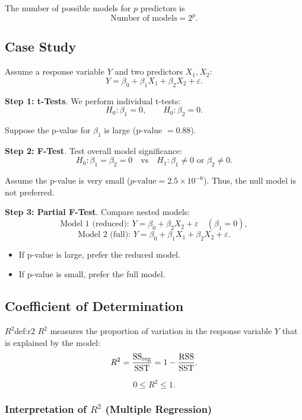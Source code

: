 The number of possible models for $p$ predictors is
\[
\text{Number of models} = 2^p.
\]

\subsection{Case Study}

Assume a response variable $Y$ and two predictors $X_1, X_2$:
\[
Y = \beta_0 + \beta_1 X_1 + \beta_2 X_2 + \varepsilon.
\]

\textbf{Step 1: t-Tests}. We perform individual t-tests:
\[
H_0: \beta_1 = 0, \qquad H_0: \beta_2 = 0.
\]

Suppose the p-value for $\beta_1$ is large (p-value $= 0.88$).

\textbf{Step 2: F-Test}. Test overall model significance:
\[
H_0: \beta_1 = \beta_2 = 0
\quad \text{vs} \quad
H_1: \beta_1 \neq 0 \text{ or } \beta_2 \neq 0.
\]

Assume the p-value is very small ($p\text{-value} = 2.5 \times 10^{-6}$). Thus, the null model is not preferred.

\textbf{Step 3: Partial F-Test}. Compare nested models:
\[
\text{Model 1 (reduced): } Y = \beta_0 + \beta_2 X_2 + \varepsilon \quad (\beta_1 = 0),
\]
\[
\text{Model 2 (full): } Y = \beta_0 + \beta_1 X_1 + \beta_2 X_2 + \varepsilon.
\]

\begin{itemize}
\item If p-value is large, prefer the reduced model.
\item If p-value is small, prefer the full model.
\end{itemize}

\subsection{Coefficient of Determination}

\begin{defn}{$R^2$}{def:r2}
$R^2$ measures the proportion of variation in the response variable $Y$ that is explained by the model:
\[
R^2 = \frac{\mathrm{SS}_{\mathrm{reg}}}{\mathrm{SST}} = 1 - \frac{\mathrm{RSS}}{\mathrm{SST}}.
\]
\end{defn}

\[
0 \le R^2 \le 1.
\]

\subsubsection{Interpretation of $R^2$ (Multiple Regression)}

